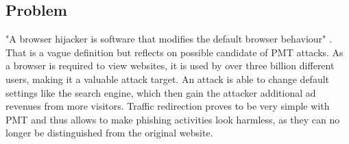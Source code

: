\subsection{Problem}
"A browser hijacker is software that modifies the default browser behaviour" \cite{automatedspywarecollection}. That is a  vague definition but reflects on possible candidate of \gls{PMT} attacks. As a browser is required to view websites, it is used by over three billion \cite{cia} different users, making it a valuable attack target. An attack is able to change default settings like the search engine, which then gain the attacker additional ad revenues from more visitors. Traffic redirection proves to be very simple with \gls{PMT} and thus allows to make phishing activities look harmless, as they can no longer be distinguished from the original website.
